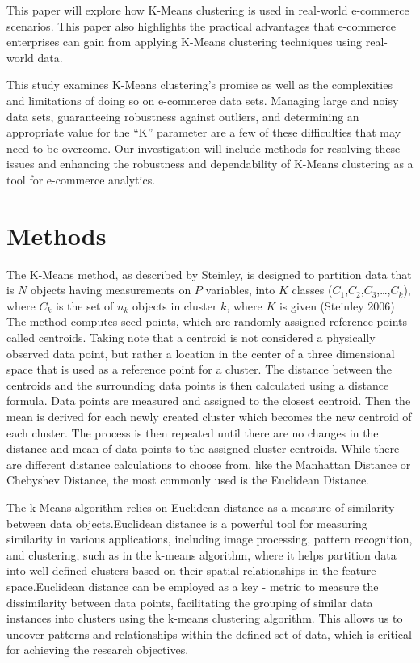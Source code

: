\documentclass[
  letterpaper,
  DIV=11,
  numbers=noendperiod]{scrreprt}
\begin{document}
This paper will explore how K-Means clustering is used in real-world
e-commerce scenarios. This paper also highlights the practical
advantages that e-commerce enterprises can gain from applying K-Means
clustering techniques using real-world data.

This study examines K-Means clustering's promise as well as the
complexities and limitations of doing so on e-commerce data sets.
Managing large and noisy data sets, guaranteeing robustness against
outliers, and determining an appropriate value for the ``K'' parameter
are a few of these difficulties that may need to be overcome. Our
investigation will include methods for resolving these issues and
enhancing the robustness and dependability of K-Means clustering as a
tool for e-commerce analytics.


\hypertarget{methods}{%
\chapter{Methods}\label{methods}}

The K-Means method, as described by Steinley, is designed to partition
data that is \(N\) objects having measurements on \(P\) variables, into
\(K\) classes (\(C_1\),\(C_2\),\(C_3\),\ldots,\(C_k\)), where \(C_k\) is
the set of \(n_k\) objects in cluster \(k\), where \(K\) is given
(Steinley 2006) The method computes seed points, which are randomly
assigned reference points called centroids. Taking note that a centroid
is not considered a physically observed data point, but rather a
location in the center of a three dimensional space that is used as a
reference point for a cluster. The distance between the centroids and
the surrounding data points is then calculated using a distance formula.
Data points are measured and assigned to the closest centroid. Then the
mean is derived for each newly created cluster which becomes the new
centroid of each cluster. The process is then repeated until there are
no changes in the distance and mean of data points to the assigned
cluster centroids. While there are different distance calculations to
choose from, like the Manhattan Distance or Chebyshev Distance, the most
commonly used is the Euclidean Distance.

The k-Means algorithm relies on Euclidean distance as a measure of
similarity between data objects.Euclidean distance is a powerful tool
for measuring similarity in various applications, including image
processing, pattern recognition, and clustering, such as in the k-means
algorithm, where it helps partition data into well-defined clusters
based on their spatial relationships in the feature space.Euclidean
distance can be employed as a key - metric to measure the dissimilarity
between data points, facilitating the grouping of similar data instances
into clusters using the k-means clustering algorithm. This allows us to
uncover patterns and relationships within the defined set of data, which
is critical for achieving the research objectives.
\end{document}
